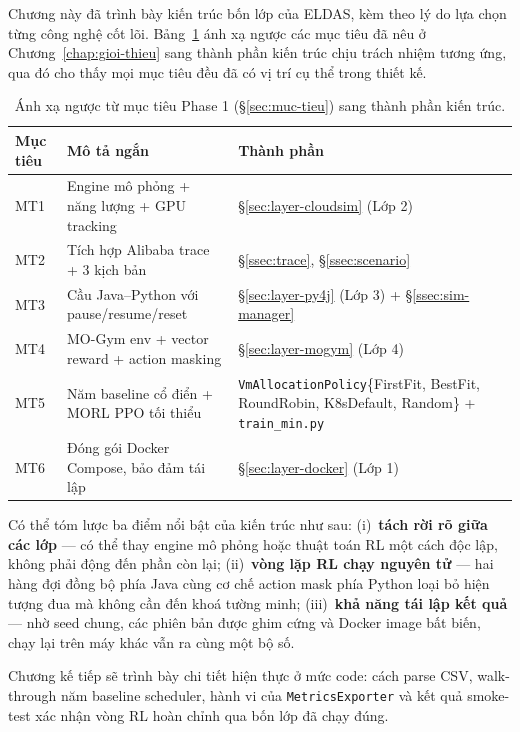 Chương này đã trình bày kiến trúc bốn lớp của ELDAS, kèm theo lý do
lựa chọn từng công nghệ cốt lõi. Bảng~\ref{tab:requirement-trace}
ánh xạ ngược các mục tiêu đã nêu ở Chương~\ref{chap:gioi-thieu} sang
thành phần kiến trúc chịu trách nhiệm tương ứng, qua đó cho thấy mọi
mục tiêu đều đã có vị trí cụ thể trong thiết kế.

\begin{table}[H]
  \centering
  \caption{Ánh xạ ngược từ mục tiêu Phase 1 (§\ref{sec:muc-tieu}) sang thành phần kiến trúc.}
  \label{tab:requirement-trace}
  \footnotesize
  \begin{tabularx}{\linewidth}{l l X}
    \toprule
    \textbf{Mục tiêu} & \textbf{Mô tả ngắn} & \textbf{Thành phần} \\
    \midrule
    MT1 & Engine mô phỏng + năng lượng + GPU tracking
        & §\ref{sec:layer-cloudsim} (Lớp 2) \\
    MT2 & Tích hợp Alibaba trace + 3 kịch bản
        & §\ref{ssec:trace}, §\ref{ssec:scenario} \\
    MT3 & Cầu Java--Python với pause/resume/reset
        & §\ref{sec:layer-py4j} (Lớp 3) + §\ref{ssec:sim-manager} \\
    MT4 & MO-Gym env + vector reward + action masking
        & §\ref{sec:layer-mogym} (Lớp 4) \\
    MT5 & Năm baseline cổ điển + MORL PPO tối thiểu
        & \texttt{VmAllocationPolicy}\{FirstFit, BestFit, RoundRobin, K8sDefault, Random\} + \texttt{train\_min.py} \\
    MT6 & Đóng gói Docker Compose, bảo đảm tái lập
        & §\ref{sec:layer-docker} (Lớp 1) \\
    \bottomrule
  \end{tabularx}
\end{table}

Có thể tóm lược ba điểm nổi bật của kiến trúc như sau:
(i)~\textbf{tách rời rõ giữa các lớp} --- có thể thay engine mô phỏng
hoặc thuật toán RL một cách độc lập, không phải động đến phần còn lại;
(ii)~\textbf{vòng lặp RL chạy nguyên tử} --- hai hàng đợi đồng bộ phía
Java cùng cơ chế action mask phía Python loại bỏ hiện tượng đua mà
không cần đến khoá tường minh; (iii)~\textbf{khả năng tái lập kết
quả} --- nhờ seed chung, các phiên bản được ghim cứng và Docker image
bất biến, chạy lại trên máy khác vẫn ra cùng một bộ số.

Chương kế tiếp sẽ trình bày chi tiết hiện thực ở mức code: cách parse
CSV, walk-through năm baseline scheduler, hành vi của
\texttt{MetricsExporter} và kết quả smoke-test xác nhận vòng RL hoàn
chỉnh qua bốn lớp đã chạy đúng.
